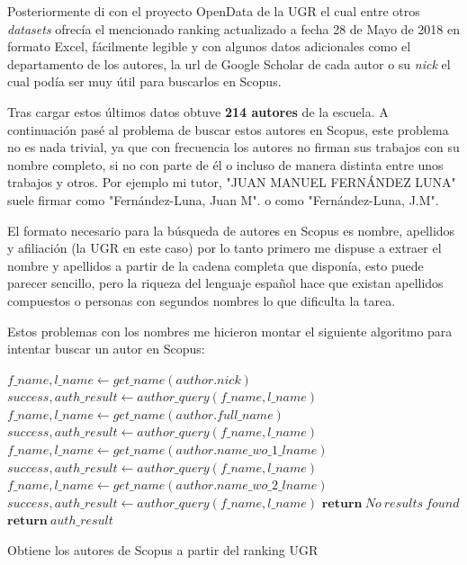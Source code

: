 Posteriormente di con el proyecto OpenData de la \acrlong{UGR} el cual entre otros \textit{datasets} ofrecía el mencionado ranking actualizado a fecha 28 de Mayo de 2018 \cite{opendataUGR} en formato Excel, fácilmente legible y con algunos datos adicionales como el departamento de los autores, la url de Google Scholar de cada autor o su \textit{nick} el cual podía ser muy útil para buscarlos en Scopus.

Tras cargar estos últimos datos obtuve \textbf{214 autores} de la escuela. A continuación pasé al problema de buscar estos autores en Scopus, este problema no es nada trivial, ya que con frecuencia los autores no firman sus trabajos con su nombre completo, si no con parte de él o incluso de manera distinta entre unos trabajos y otros. Por ejemplo mi tutor, "JUAN MANUEL FERNÁNDEZ LUNA" suele firmar como "Fernández-Luna, Juan M". o como "Fernández-Luna, J.M".

El formato necesario para la búsqueda de autores en Scopus es nombre, apellidos y afiliación (la \acrshort{UGR} en este caso) por lo tanto primero me dispuse a extraer el nombre y apellidos a partir de la cadena completa que disponía, esto puede parecer sencillo, pero la riqueza del lenguaje español hace que existan apellidos compuestos o personas con segundos nombres lo que dificulta la tarea.

Estos problemas con los nombres me hicieron montar el siguiente algoritmo para intentar buscar un autor en Scopus:


\begin{algorithm}[h]
	\begin{algorithmic} 
		\State $f\_name, l\_name \gets get\_name(author.nick)$
		\State $success, auth\_result  \gets author\_query(f\_name, l\_name)$
		\State $f\_name, l\_name \gets get\_name(author.full\_name)$
		\State $success, auth\_result  \gets author\_query(f\_name, l\_name)$
		\State $f\_name, l\_name \gets get\_name(author.name\_wo\_1\_lname)$
		\State $success, auth\_result  \gets author\_query(f\_name, l\_name)$
		\State $f\_name, l\_name \gets get\_name(author.name\_wo\_2\_lname)$
		\State $success, auth\_result  \gets author\_query(f\_name, l\_name)$
		\State $\textbf{return}\ No\ results\ found$
		\EndIf
		\EndIf
		\EndIf
		\EndIf
		\State $\textbf{return}\ auth\_result$
	
		\EndFor
	\end{algorithmic}  
	\caption{Obtiene los autores de Scopus a partir del ranking UGR}	
\end{algorithm}


